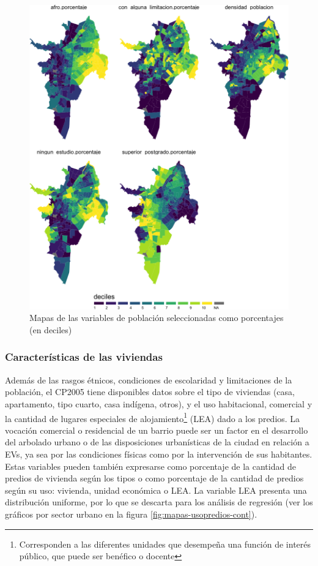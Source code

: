 \documentclass[12pt,a4paper,oneside, openany]{book}
\let\rmarkdownfootnote\footnote%
\def\footnote{\protect\rmarkdownfootnote}
\theoremstyle{definition}
\theoremstyle{definition}
\theoremstyle{definition}
\theoremstyle{remark}
\begin{document}
\begin{figure}[H]

{\centering \includegraphics[width=0.9\linewidth]{tesis-unigis_files/figure-latex/mapas-poblacion-mod-deciles-1} 

}

\caption{Mapas de las variables de población seleccionadas como porcentajes (en deciles)}\label{fig:mapas-poblacion-mod-deciles}
\end{figure}

\subsubsection{Características de las
viviendas}\label{caracteruxedsticas-de-las-viviendas}

Además de las rasgos étnicos, condiciones de escolaridad y limitaciones
de la población, el CP2005 tiene disponibles datos sobre el tipo de
viviendas (casa, apartamento, tipo cuarto, casa indígena, otros), y el
uso habitacional, comercial y la cantidad de lugares especiales de
alojamiento\footnote{Corresponden a las diferentes unidades que
  desempeña una función de interés público, que puede ser benéfico o
  docente} (LEA) dado a los predios. La vocación comercial o residencial
de un barrio puede ser un factor en el desarrollo del arbolado urbano o
de las disposiciones urbanísticas de la ciudad en relación a EVs, ya sea
por las condiciones físicas como por la intervención de sus habitantes.
Estas variables pueden también expresarse como porcentaje de la cantidad
de predios de vivienda según los tipos o como porcentaje de la cantidad
de predios según su uso: vivienda, unidad económica o LEA. La variable
LEA presenta una distribución uniforme, por lo que se descarta para los
análisis de regresión (ver los gráficos por sector urbano en la figura
\ref{fig:mapas-usopredios-cont}).
\end{document}
